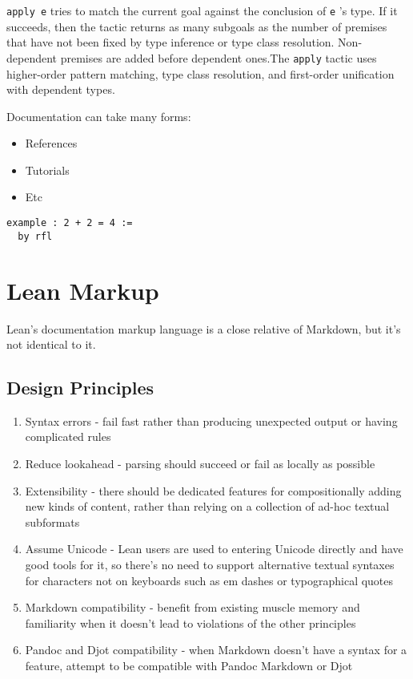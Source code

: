 \documentclass{memoir}
\begin{document}
\Verb|apply e|
 tries to match the current goal against the conclusion of \Verb|e|
's type.
If it succeeds, then the tactic returns as many subgoals as the number of premises that
have not been fixed by type inference or type class resolution.
Non-dependent premises are added before dependent ones.The \Verb|apply|
 tactic uses higher-order pattern matching, type class resolution,
and first-order unification with dependent types.

Documentation can take many forms:

\begin{itemize}
\item References\item Tutorials\item Etc
\end{itemize}


\begin{verbatim}
example : 2 + 2 = 4 :=
  by rfl

\end{verbatim}





\section{Lean Markup}

Lean's documentation markup language is a close relative of Markdown, but it's not identical to it.



\subsection{Design Principles}

\begin{enumerate}
\item Syntax errors - fail fast rather than producing unexpected output or having complicated rules\item Reduce lookahead - parsing should succeed or fail as locally as possible\item Extensibility - there should be dedicated features for compositionally adding new kinds of content, rather than relying on a collection of ad-hoc textual subformats\item Assume Unicode - Lean users are used to entering Unicode directly and have good tools for it, so there's no need to support alternative textual syntaxes for characters not on keyboards such as em dashes or typographical quotes\item Markdown compatibility - benefit from existing muscle memory and familiarity when it doesn't lead to violations of the other principles\item Pandoc and Djot compatibility - when Markdown doesn't have a syntax for a feature, attempt to be compatible with Pandoc Markdown or Djot
\end{enumerate}
\end{document}
